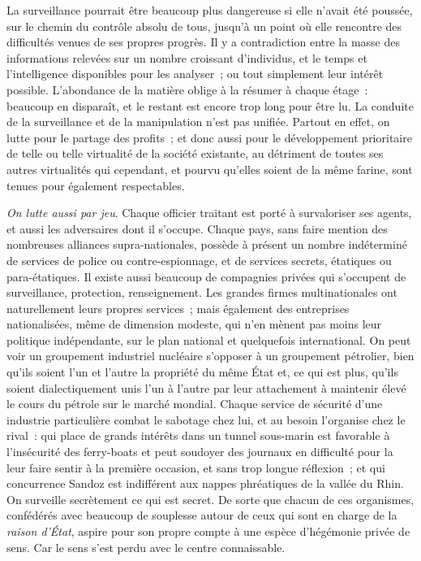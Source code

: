 \documentclass[french,twoside]{book} %
\begin{document}
\noindent La surveillance pourrait être beaucoup plus dangereuse si elle n’avait été poussée, sur le chemin du contrôle absolu de tous, jusqu’à un point où elle rencontre des difficultés venues de ses propres progrès. Il y a contradiction entre la masse des informations relevées sur un nombre croissant d’individus, et le temps et l’intelligence disponibles pour les analyser ; ou tout simplement leur intérêt possible. L’abondance de la matière oblige à la résumer à chaque étage : beaucoup en disparaît, et le restant est encore trop long pour être lu. La conduite de la surveillance et de la manipulation n’est pas unifiée. Partout en effet, on lutte pour le partage des profits ; et donc aussi pour le développement prioritaire de telle ou telle virtualité de la société existante, au détriment de toutes ses autres virtualités qui cependant, et pourvu qu’elles soient de la même farine, sont tenues pour également respectables.\par
\emph{On lutte aussi par jeu}. Chaque officier traitant est porté à survaloriser ses agents, et aussi les adversaires dont il s’occupe. Chaque pays, sans faire mention des nombreuses alliances supra-nationales, possède à présent un nombre indéterminé de services de police ou contre-espionnage, et de services secrets, étatiques ou para-étatiques. Il existe aussi beaucoup de compagnies privées qui s’occupent de surveillance, protection, renseignement. Les grandes firmes multinationales ont naturellement leurs propres services ; mais également des entreprises nationalisées, même de dimension modeste, qui n’en mènent pas moins leur politique indépendante, sur le plan national et quelquefois international. On peut voir un groupement industriel nucléaire s’opposer à un groupement pétrolier, bien qu’ils soient l’un et l’autre la propriété du même État et, ce qui est plus, qu’ils soient dialectiquement unis l’un à l’autre par leur attachement à maintenir élevé le cours du pétrole sur le marché mondial. Chaque service de sécurité d’une industrie particulière combat le sabotage chez lui, et au besoin l’organise chez le rival : qui place de grands intérêts dans un tunnel sous-marin est favorable à l’insécurité des ferry-boats et peut soudoyer des journaux en difficulté pour la leur faire sentir à la première occasion, et sans trop longue réflexion ; et qui concurrence Sandoz est indifférent aux nappes phréatiques de la vallée du Rhin. On surveille secrètement ce qui est secret. De sorte que chacun de ces organismes, confédérés avec beaucoup de souplesse autour de ceux qui sont en charge de la \emph{raison d’État}, aspire pour son propre compte à une espèce d’hégémonie privée de sens. Car le sens s’est perdu avec le centre connaissable.\par
\end{document}

